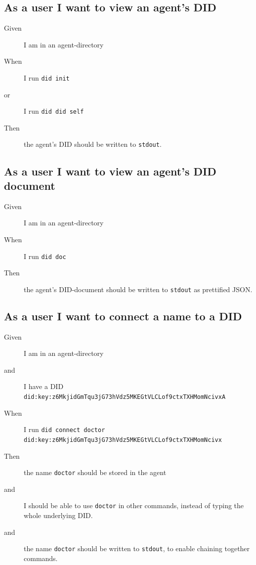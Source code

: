 \subsection{As a user I want to view an agent's DID}
\begin{description}\begin{description}
    \item[Given] I am in an agent-directory
    \item[When] I run \texttt{did init}
    \item[or] I run \texttt{did did self}
    \item[Then] the agent's DID should be written to \texttt{stdout}.
\end{description}\end{description}


\subsection{As a user I want to view an agent's DID document}
\begin{description}\begin{description}
    \item[Given] I am in an agent-directory
    \item[When] I run \texttt{did doc}
    \item[Then] the agent's DID-document should be written to \texttt{stdout} as prettified JSON.
\end{description}\end{description}


\subsection{As a user I want to connect a name to a DID}
\begin{description}\begin{description}
    \item[Given] I am in an agent-directory
    \item[and] I have a DID \texttt{did:key:z6MkjidGmTqu3jG73hVdz5MKEGtVLCLof9ctxTXHMomNcivxA}
    \item[When] I run \texttt{did connect doctor did:key:z6MkjidGmTqu3jG73hVdz5MKEGtVLCLof9ctxTXHMomNcivx}
    \item[Then] the name \texttt{doctor} should be stored in the agent
    \item[and] I should be able to use \texttt{doctor} in other commands, instead of typing the whole underlying DID.
    \item[and] the name \texttt{doctor} should be written to \texttt{stdout}, to enable chaining together commands.
\end{description}\end{description}


